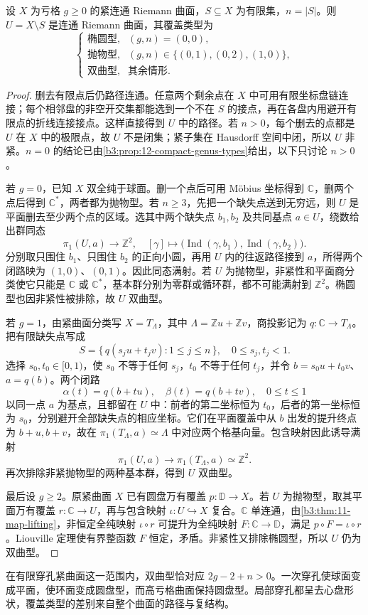 \begin{proposition}[紧曲面的有限穿孔]\label{b3:prop:12-finite-punctures}
设 \(X\) 为亏格 \(g\ge0\) 的紧连通 Riemann 曲面，\(S\subseteq X\) 为有限集，\(n=|S|\)。则 \(U=X\setminus S\) 是连通 Riemann 曲面，其覆盖类型为
\[
 \begin{cases}
 \text{椭圆型},&(g,n)=(0,0),\\
 \text{抛物型},&(g,n)\in\{(0,1),(0,2),(1,0)\},\\
 \text{双曲型},&\text{其余情形}.
 \end{cases}
\]
\end{proposition}
\begin{proof}
删去有限点后仍路径连通。任意两个剩余点在 \(X\) 中可用有限坐标盘链连接；每个相邻盘的非空开交集都能选到一个不在 \(S\) 的接点，再在各盘内用避开有限点的折线连接接点。这样直接得到 \(U\) 中的路径。若 \(n>0\)，每个删去的点都是 \(U\) 在 \(X\) 中的极限点，故 \(U\) 不是闭集；紧子集在 Hausdorff 空间中闭，所以 \(U\) 非紧。\(n=0\) 的结论已由\cref{b3:prop:12-compact-genus-types}给出，以下只讨论 \(n>0\)。

若 \(g=0\)，已知 \(X\) 双全纯于球面。删一个点后可用 Möbius 坐标得到 \(\mathbb C\)，删两个点后得到 \(\mathbb C^*\)，两者都为抛物型。若 \(n\ge3\)，先把一个缺失点送到无穷远，则 \(U\) 是平面删去至少两个点的区域。选其中两个缺失点 \(b_1,b_2\) 及共同基点 \(a\in U\)，绕数给出群同态
\[
 \pi_1(U,a)\longrightarrow\mathbb Z^2,\quad
 [\gamma]\longmapsto
 \bigl(\operatorname{Ind}(\gamma,b_1),
       \operatorname{Ind}(\gamma,b_2)\bigr).
\]
分别取只围住 \(b_1\)、只围住 \(b_2\) 的正向小圆，再用 \(U\) 内的往返路径接到 \(a\)，所得两个闭路映为 \((1,0)\)、\((0,1)\)。因此同态满射。若 \(U\) 为抛物型，非紧性和平面商分类使它只能是 \(\mathbb C\) 或 \(\mathbb C^*\)，基本群分别为零群或循环群，都不可能满射到 \(\mathbb Z^2\)。椭圆型也因非紧性被排除，故 \(U\) 双曲型。

若 \(g=1\)，由紧曲面分类写 \(X=T_\Lambda\)，其中 \(\Lambda=\mathbb Zu+\mathbb Zv\)，商投影记为 \(q:\mathbb C\rightarrow T_\Lambda\)。把有限缺失点写成
\[
 S=\{\,q(s_j u+t_j v):1\le j\le n\,\},
 \quad 0\le s_j,t_j<1.
\]
选择 \(s_0,t_0\in[0,1)\)，使 \(s_0\) 不等于任何 \(s_j\)，\(t_0\) 不等于任何 \(t_j\)，并令 \(b=s_0u+t_0v\)、\(a=q(b)\)。两个闭路
\[
 \alpha(t)=q(b+tu),\quad
 \beta(t)=q(b+tv),\quad 0\le t\le1
\]
以同一点 \(a\) 为基点，且都留在 \(U\) 中：前者的第二坐标恒为 \(t_0\)，后者的第一坐标恒为 \(s_0\)，分别避开全部缺失点的相应坐标。它们在平面覆盖中从 \(b\) 出发的提升终点为 \(b+u,b+v\)，故在 \(\pi_1(T_\Lambda,a)\simeq\Lambda\) 中对应两个格基向量。包含映射因此诱导满射
\[
 \pi_1(U,a)\longrightarrow\pi_1(T_\Lambda,a)
 \simeq\mathbb Z^2.
\]
再次排除非紧抛物型的两种基本群，得到 \(U\) 双曲型。

最后设 \(g\ge2\)。原紧曲面 \(X\) 已有圆盘万有覆盖 \(p:\mathbb D\rightarrow X\)。若 \(U\) 为抛物型，取其平面万有覆盖 \(r:\mathbb C\rightarrow U\)，再与包含映射 \(\iota:U\hookrightarrow X\) 复合。\(\mathbb C\) 单连通，由\cref{b3:thm:11-map-lifting}，非恒定全纯映射 \(\iota\circ r\) 可提升为全纯映射 \(F:\mathbb C\rightarrow\mathbb D\)，满足 \(p\circ F=\iota\circ r\)。Liouville 定理使有界整函数 \(F\) 恒定，矛盾。非紧性又排除椭圆型，所以 \(U\) 仍为双曲型。
\end{proof}

在有限穿孔紧曲面这一范围内，双曲型恰对应 \(2g-2+n>0\)。一次穿孔使球面变成平面，使环面变成圆盘型，而高亏格曲面保持圆盘型。局部穿孔都呈去心盘形状，覆盖类型的差别来自整个曲面的路径与复结构。
